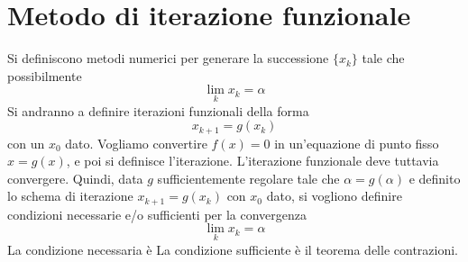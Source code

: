 \documentclass[a4paper]{article}
\begin{document}
\section{Metodo di iterazione funzionale}

Si definiscono metodi numerici per generare la successione
\(\{x_k\}\) tale che possibilmente
\[
    \lim_{k} x_k = \alpha
\]
Si andranno a definire iterazioni funzionali della forma
\[
    x_{k+1} = g(x_k)
\]
con un \(x_0\) dato. Vogliamo convertire \(f(x)=0\) in un'equazione di punto fisso
\(x=g(x)\), e poi si definisce l'iterazione.
L'iterazione funzionale deve tuttavia convergere. Quindi, data \(g\)
sufficientemente regolare tale che \(\alpha = g(\alpha)\)
e definito lo schema di iterazione \(x_{k+1} = g(x_k)\) con \(x_0\) dato,
si vogliono definire condizioni necessarie e/o sufficienti per la convergenza
\[
    \lim_k x_k = \alpha
\]
La condizione necessaria è
\sproof{}{
    \[
        \alpha = \lim_k x_k = \lim_k {x_k+1} = \lim_k g(x_k)
    \]
}
La condizione sufficiente è il teorema delle contrazioni.

\end{document}
